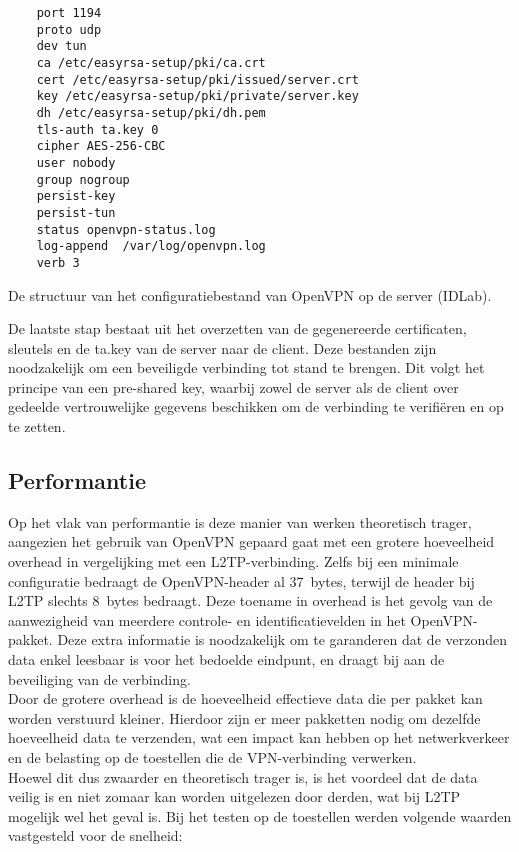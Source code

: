 \begin{listing}[H]
\begin{verbatim}
    port 1194
    proto udp
    dev tun
    ca /etc/easyrsa-setup/pki/ca.crt
    cert /etc/easyrsa-setup/pki/issued/server.crt
    key /etc/easyrsa-setup/pki/private/server.key
    dh /etc/easyrsa-setup/pki/dh.pem
    tls-auth ta.key 0
    cipher AES-256-CBC
    user nobody
    group nogroup
    persist-key
    persist-tun
    status openvpn-status.log
    log-append  /var/log/openvpn.log
    verb 3
\end{verbatim}
\caption[Configuratie bestand OpenVPN Server]{De structuur van het configuratiebestand van OpenVPN op de server (IDLab).}
\end{listing}

De laatste stap bestaat uit het overzetten van de gegenereerde certificaten, sleutels en de ta.key van de server naar de client.
Deze bestanden zijn noodzakelijk om een beveiligde verbinding tot stand te brengen. Dit volgt het principe van een pre-shared key, 
waarbij zowel de server als de client over gedeelde vertrouwelijke gegevens beschikken om de verbinding te verifiëren en op te zetten.

\subsection{Performantie}

Op het vlak van performantie is deze manier van werken theoretisch trager, aangezien het gebruik van OpenVPN gepaard gaat met een grotere hoeveelheid overhead in vergelijking met een L2TP-verbinding.
Zelfs bij een minimale configuratie bedraagt de OpenVPN-header al 37~bytes, terwijl de header bij L2TP slechts 8~bytes bedraagt. 
Deze toename in overhead is het gevolg van de aanwezigheid van meerdere controle- en identificatievelden in het OpenVPN-pakket. 
Deze extra informatie is noodzakelijk om te garanderen dat de verzonden data enkel leesbaar is voor het bedoelde eindpunt, 
en draagt bij aan de beveiliging van de verbinding.
\\

Door de grotere overhead is de hoeveelheid effectieve data die per pakket kan worden verstuurd kleiner. 
Hierdoor zijn er meer pakketten nodig om dezelfde hoeveelheid data te verzenden, wat een impact kan hebben op het netwerkverkeer en de belasting op de toestellen die de VPN-verbinding verwerken.
\\

Hoewel dit dus zwaarder en theoretisch trager is, is het voordeel dat de data veilig is en niet zomaar kan worden uitgelezen door derden, wat bij L2TP mogelijk wel het geval is.
Bij het testen op de toestellen werden volgende waarden vastgesteld voor de snelheid:

